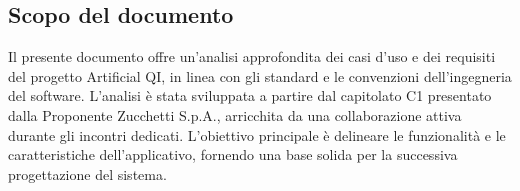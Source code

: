 \subsection{Scopo del documento}
\label{subsec:ScopoDelDocumento}
Il presente documento offre un'analisi approfondita dei casi d'uso e dei requisiti del progetto Artificial QI, in linea con gli standard e le convenzioni dell'ingegneria del software. 
L'analisi è stata sviluppata a partire dal capitolato C1 presentato dalla Proponente Zucchetti S.p.A., arricchita da una collaborazione attiva durante gli incontri dedicati. 
L'obiettivo principale è delineare le funzionalità e le caratteristiche dell'applicativo, fornendo una base solida per la successiva progettazione del sistema.